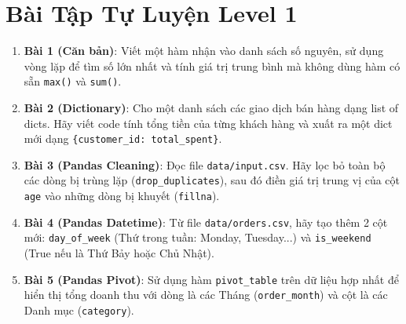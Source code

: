 \section{Bài Tập Tự Luyện Level 1}

\begin{baitapbox}
\begin{enumerate}
    \item \textbf{Bài 1 (Căn bản)}: Viết một hàm nhận vào danh sách số nguyên, sử dụng vòng lặp để tìm số lớn nhất và tính giá trị trung bình mà không dùng hàm có sẵn \texttt{max()} và \texttt{sum()}.
    \item \textbf{Bài 2 (Dictionary)}: Cho một danh sách các giao dịch bán hàng dạng list of dicts. Hãy viết code tính tổng tiền của từng khách hàng và xuất ra một dict mới dạng \texttt{\{customer\_id: total\_spent\}}.
    \item \textbf{Bài 3 (Pandas Cleaning)}: Đọc file \texttt{data/input.csv}. Hãy lọc bỏ toàn bộ các dòng bị trùng lặp (\texttt{drop\_duplicates}), sau đó điền giá trị trung vị của cột \texttt{age} vào những dòng bị khuyết (\texttt{fillna}).
    \item \textbf{Bài 4 (Pandas Datetime)}: Từ file \texttt{data/orders.csv}, hãy tạo thêm 2 cột mới: \texttt{day\_of\_week} (Thứ trong tuần: Monday, Tuesday...) và \texttt{is\_weekend} (True nếu là Thứ Bảy hoặc Chủ Nhật).
    \item \textbf{Bài 5 (Pandas Pivot)}: Sử dụng hàm \texttt{pivot\_table} trên dữ liệu hợp nhất để hiển thị tổng doanh thu với dòng là các Tháng (\texttt{order\_month}) và cột là các Danh mục (\texttt{category}).
\end{enumerate}
\end{baitapbox}

